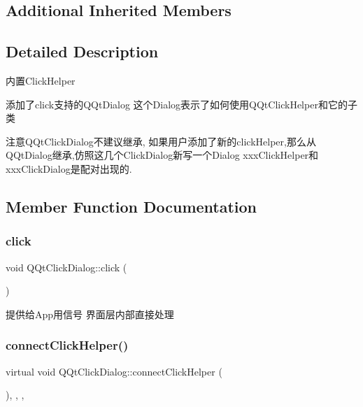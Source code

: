 \subsection*{Additional Inherited Members}


\subsection{Detailed Description}
内置\+Click\+Helper

添加了click支持的\+Q\+Qt\+Dialog 这个\+Dialog表示了如何使用\+Q\+Qt\+Click\+Helper和它的子类

注意\+Q\+Qt\+Click\+Dialog不建议继承, 如果用户添加了新的click\+Helper,那么从\+Q\+Qt\+Dialog继承,仿照这几个\+Click\+Dialog新写一个\+Dialog xxx\+Click\+Helper和xxx\+Click\+Dialog是配对出现的. 

\subsection{Member Function Documentation}
\mbox{\label{class_q_qt_click_dialog_a70d4dac14db4e322ed334888163f5035}} 
\subsubsection{\texorpdfstring{click}{click}}
{\footnotesize\ttfamily void Q\+Qt\+Click\+Dialog\+::click (\begin{DoxyParamCaption}{ }\end{DoxyParamCaption})\hspace{0.3cm}{\ttfamily [signal]}}

提供给\+App用信号 界面层内部直接处理 \mbox{\label{class_q_qt_click_dialog_abe0a809f78f668db917f87ddfc50767f}} 
\subsubsection{\texorpdfstring{connect\+Click\+Helper()}{connectClickHelper()}}
{\footnotesize\ttfamily virtual void Q\+Qt\+Click\+Dialog\+::connect\+Click\+Helper (\begin{DoxyParamCaption}{ }\end{DoxyParamCaption})\hspace{0.3cm}{\ttfamily [inline]}, {\ttfamily [override]}, {\ttfamily [protected]}, {\ttfamily [virtual]}}

